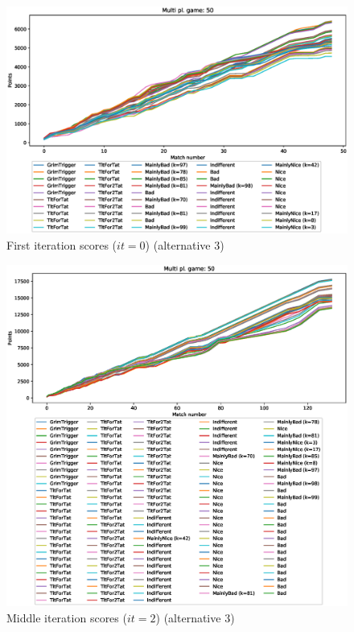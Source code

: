 \documentclass[journal,10pt,twoside]{IEEEtran}
\begin{document}
\begin{figure}[!ht]
    \centering
    \includegraphics[width=1\columnwidth]{../img/ripdmp-incr/alt3/ripdmp-scores-increasing-pop-50-r0}
    \caption{First iteration scores ($it=0$) (alternative 3)}
    \label{fig:incrFIa3}
\end{figure}

\begin{figure}[!ht]
    \centering
    \includegraphics[width=1\columnwidth]{../img/ripdmp-incr/alt3/ripdmp-scores-increasing-pop-50-r2}
    \caption{Middle iteration scores ($it=2$) (alternative 3)}
    \label{fig:incrMIa3}
\end{figure}
\end{document}
